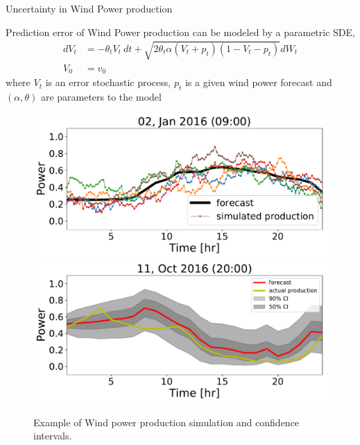 \documentclass[aspectratio=169]{beamer}\usepackage[utf8]{inputenc}
\begin{document}
\begin{frame}{Uncertainty in Wind Power production}
\begin{minipage}{0.4\textwidth}
Prediction error of Wind Power production can be modeled by a parametric SDE,
		\begin{equation*}
		\begin{split}
		dV_t &=  - \theta_t V_t \  dt + \sqrt{2 \theta_t \alpha (V_t +p_t ) (1-V_t-p_t)} dW_t  \\ %
		V_0 & = v_0
	\end{split}
	\end{equation*}
	where $V_t$ is an error stochastic process, $p_t$ is a given wind power forecast and $(\alpha, \theta)$ are parameters to the model
\end{minipage}%
\begin{minipage}{0.6\textwidth}
		\begin{figure}
			\includegraphics[width=0.7\linewidth]{plots_SGD/0.pdf}\\
			\hskip 125pt
			\includegraphics[width=0.7\linewidth]{plots_SGD/820.pdf}
			\caption{Example of Wind power production simulation and confidence intervals.}
			\end{figure}
\end{minipage}
\end{frame}
\end{document}
